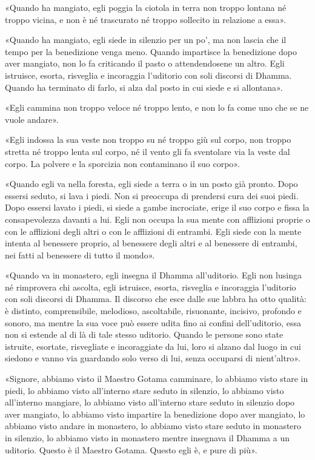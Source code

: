«Quando ha mangiato, egli poggia la ciotola in terra non troppo lontana né
troppo vicina, e non è né trascurato né troppo sollecito in relazione a essa».

«Quando ha mangiato, egli siede in silenzio per un po’, ma non lascia che il
tempo per la benedizione venga meno. Quando impartisce la benedizione dopo aver
mangiato, non lo fa criticando il pasto o attendendosene un altro. Egli
istruisce, esorta, risveglia e incoraggia l’uditorio con soli discorsi di
Dhamma. Quando ha terminato di farlo, si alza dal posto in cui siede e si
allontana».

«Egli cammina non troppo veloce né troppo lento, e non lo fa come uno che se ne
vuole andare».

«Egli indossa la sua veste non troppo su né troppo giù sul corpo, non troppo
stretta né troppo lenta sul corpo, né il vento gli fa sventolare via la veste
dal corpo. La polvere e la sporcizia non contaminano il suo corpo».

«Quando egli va nella foresta, egli siede a terra o in un posto già pronto. Dopo
essersi seduto, si lava i piedi. Non si preoccupa di prendersi cura dei suoi
piedi. Dopo essersi lavato i piedi, si siede a gambe incrociate, erige il suo
corpo e fissa la consapevolezza davanti a lui. Egli non occupa la sua mente con
afflizioni proprie o con le afflizioni degli altri o con le afflizioni di
entrambi. Egli siede con la mente intenta al benessere proprio, al benessere
degli altri e al benessere di entrambi, nei fatti al benessere di tutto il
mondo».

«Quando va in monastero, egli insegna il Dhamma all’uditorio. Egli non lusinga
né rimprovera chi ascolta, egli istruisce, esorta, risveglia e incoraggia
l’uditorio con soli discorsi di Dhamma. Il discorso che esce dalle sue labbra ha
otto qualità: è distinto, comprensibile, melodioso, ascoltabile, risuonante,
incisivo, profondo e sonoro, ma mentre la sua voce può essere udita fino ai
confini dell’uditorio, essa non si estende al di là di tale stesso uditorio.
Quando le persone sono state istruite, esortate, risvegliate e incoraggiate da
lui, loro si alzano dal luogo in cui siedono e vanno via guardando solo verso di
lui, senza occuparsi di nient’altro».

«Signore, abbiamo visto il Maestro Gotama camminare, lo abbiamo visto stare in
piedi, lo abbiamo visto all’interno stare seduto in silenzio, lo abbiamo visto
all’interno mangiare, lo abbiamo visto all’interno stare seduto in silenzio dopo
aver mangiato, lo abbiamo visto impartire la benedizione dopo aver mangiato, lo
abbiamo visto andare in monastero, lo abbiamo visto stare seduto in monastero in
silenzio, lo abbiamo visto in monastero mentre insegnava il Dhamma a un
uditorio. Questo è il Maestro Gotama. Questo egli è, e pure di più».

